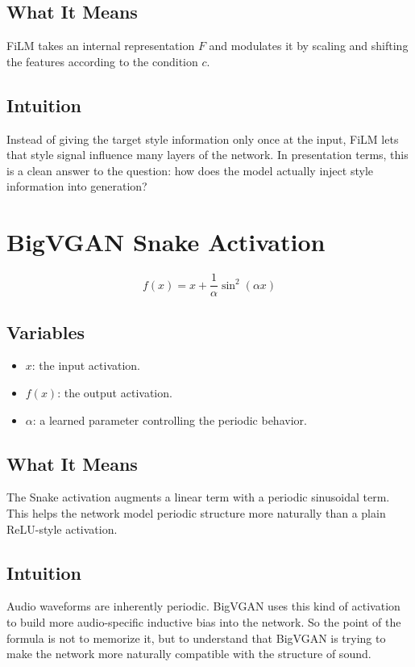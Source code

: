 \documentclass[11pt]{article}
\begin{document}
\subsection*{What It Means}
FiLM takes an internal representation \(F\) and modulates it by scaling and shifting the features according to the condition \(c\).

\subsection*{Intuition}
Instead of giving the target style information only once at the input, FiLM lets that style signal influence many layers of the network. In presentation terms, this is a clean answer to the question: how does the model actually inject style information into generation?

\section{BigVGAN Snake Activation}

\begin{equation*}
f(x)=x+\frac{1}{\alpha}\sin^2(\alpha x)
\end{equation*}

\subsection*{Variables}
\begin{itemize}
\item \(x\): the input activation.
\item \(f(x)\): the output activation.
\item \(\alpha\): a learned parameter controlling the periodic behavior.
\end{itemize}

\subsection*{What It Means}
The Snake activation augments a linear term with a periodic sinusoidal term. This helps the network model periodic structure more naturally than a plain ReLU-style activation.

\subsection*{Intuition}
Audio waveforms are inherently periodic. BigVGAN uses this kind of activation to build more audio-specific inductive bias into the network. So the point of the formula is not to memorize it, but to understand that BigVGAN is trying to make the network more naturally compatible with the structure of sound.
\end{document}
